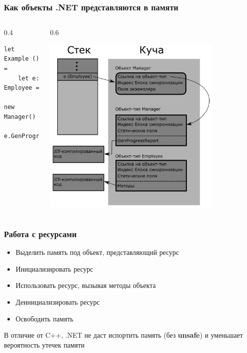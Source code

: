 \documentclass{../../slides-style}
\begin{document}
    \begin{frame}[fragile]
        \frametitle{Как объекты .NET представляются в памяти}
        \begin{columns}
            \begin{column}{0.4\textwidth}
                \begin{verbatim}
let Example () =
    let e: Employee = 
        new Manager()
    e.GenProgressReport()
                \end{verbatim}
            \end{column}
            \begin{column}{0.6\textwidth}
                \begin{center}
                    \includegraphics[width=0.8\textwidth]{objectInMemory.png}
                \end{center}
            \end{column}
        \end{columns}
    \end{frame}

    \begin{frame}
        \frametitle{Работа с ресурсами}
        \begin{itemize}
            \item Выделить память под объект, представляющий ресурс
            \item Инициализировать ресурс
            \item Использовать ресурс, вызывая методы объекта
            \item Деинициализировать ресурс
            \item Освободить память
        \end{itemize}
        В отличие от C++, .NET не даст испортить память (без \textbf{unsafe}) и уменьшает вероятность утечек памяти
    \end{frame}
\end{document}
